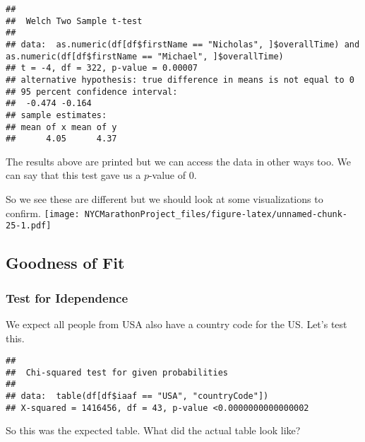 \documentclass[
]{article}
\newenvironment{Shaded}{\begin{snugshade}}{\end{snugshade}}
\newcommand{\FunctionTok}[1]{\textcolor[rgb]{0.13,0.29,0.53}{\textbf{#1}}}
\newcommand{\NormalTok}[1]{#1}
\newcommand{\OtherTok}[1]{\textcolor[rgb]{0.56,0.35,0.01}{#1}}
\newcommand{\SpecialCharTok}[1]{\textcolor[rgb]{0.81,0.36,0.00}{\textbf{#1}}}
\newcommand{\StringTok}[1]{\textcolor[rgb]{0.31,0.60,0.02}{#1}}
\begin{document}
\begin{verbatim}
## 
##  Welch Two Sample t-test
## 
## data:  as.numeric(df[df$firstName == "Nicholas", ]$overallTime) and as.numeric(df[df$firstName == "Michael", ]$overallTime)
## t = -4, df = 322, p-value = 0.00007
## alternative hypothesis: true difference in means is not equal to 0
## 95 percent confidence interval:
##  -0.474 -0.164
## sample estimates:
## mean of x mean of y 
##      4.05      4.37
\end{verbatim}

The results above are printed but we can access the data in other ways
too. We can say that this test gave us a \(p\)-value of 0.

So we see these are different but we should look at some visualizations
to confirm.
\texttt{[image: NYCMarathonProject\_files/figure-latex/unnamed-chunk-25-1.pdf]}

\subsection{Goodness of Fit}\label{goodness-of-fit}

\subsubsection{Test for Idependence}\label{test-for-idependence}

We expect all people from USA also have a country code for the US. Let's
test this.

\begin{Shaded}
\end{Shaded}

\begin{verbatim}
## 
##  Chi-squared test for given probabilities
## 
## data:  table(df[df$iaaf == "USA", "countryCode"])
## X-squared = 1416456, df = 43, p-value <0.0000000000000002
\end{verbatim}

So this was the expected table. What did the actual table look like?

\begin{Shaded}
\end{Shaded}
\end{document}

